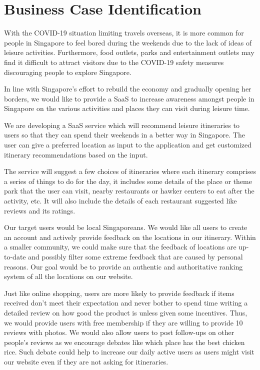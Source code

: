 \documentclass[12pt,a4paper]{article}
\begin{document}
\section{Business Case Identification}

With the COVID-19 situation limiting travels overseas, it is more common for people in Singapore to feel bored during the weekends due to the lack of ideas of leisure activities. Furthermore, food outlets, parks and entertainment outlets may find it difficult to attract visitors due to the COVID-19 safety measures discouraging people to explore Singapore.

In line with Singapore’s effort to rebuild the economy and gradually opening her borders, we would like to provide a SaaS to increase awareness amongst people in Singapore on the various activities and places they can visit during leisure time.

We are developing a SaaS service which will recommend leisure itineraries to users so that they can spend their weekends in a better way in Singapore. The user can give a preferred location as input to the application and get customized itinerary recommendations based on the input.

The service will suggest a few choices of itineraries where each itinerary comprises a series of things to do for the day, it includes some details of the place or theme park that the user can visit, nearby restaurants or hawker centers to eat after the activity, etc. It will also include the details of each restaurant suggested like reviews and its ratings.

Our target users would be local Singaporeans. We would like all users to create an account and actively provide feedback on the locations in our itinerary. Within a smaller community, we could make sure that the feedback of locations are up-to-date and possibly filter some extreme feedback that are caused by personal reasons. Our goal would be to provide an authentic and authoritative ranking system of all the locations on our website. 

Just like online shopping, users are more likely to provide feedback if items received don’t meet their expectation and never bother to spend time writing a detailed review on how good the product is unless given some incentives. Thus, we would provide users with free membership if they are willing to provide 10 reviews with photos. We would also allow users to post follow-ups on other people’s reviews as we encourage debates like which place has the best chicken rice. Such debate could help to increase our daily active users as users might visit our website even if they are not asking for itineraries.
\end{document}
